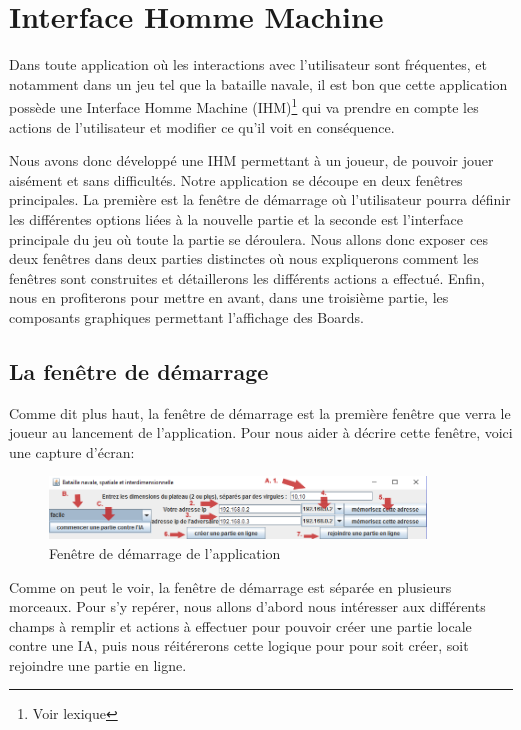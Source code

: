 \section{Interface Homme Machine}
	Dans toute application où les interactions avec l'utilisateur sont fréquentes, et notamment dans un jeu tel que la bataille navale, il est bon que cette application possède une Interface Homme Machine (IHM)\footnote{Voir lexique} qui va prendre en compte les actions de l'utilisateur et modifier ce qu'il voit en conséquence. \newline
	
	Nous avons donc développé une IHM permettant à un joueur, de pouvoir jouer aisément et sans difficultés. Notre application se découpe en deux fenêtres principales. La première est la fenêtre de démarrage où l'utilisateur pourra définir les différentes options liées à la nouvelle partie et la seconde est l'interface principale du jeu où toute la partie se déroulera. Nous allons donc exposer ces deux fenêtres dans deux parties distinctes où nous expliquerons comment les fenêtres sont construites et détaillerons les différents actions a effectué. Enfin, nous en profiterons pour mettre en avant, dans une troisième partie, les composants graphiques permettant l'affichage des Boards. 
	
\subsection{La fenêtre de démarrage}
	Comme dit plus haut, la fenêtre de démarrage est la première fenêtre que verra le joueur au lancement de l'application. Pour nous aider à décrire cette fenêtre, voici une capture d'écran:
	
	\begin{figure}[!h]
		\centering
		\includegraphics [width=10cm]{images/start_window.png}
		\caption{Fenêtre de démarrage de l'application}
		\label {startwindow}
	\end{figure}
	
	Comme on peut le voir, la fenêtre de démarrage est séparée en plusieurs morceaux. Pour s'y repérer, nous allons d'abord nous intéresser aux différents champs à remplir et actions à effectuer pour pouvoir créer une partie locale contre une IA, puis nous réitérerons cette logique pour pour soit créer, soit rejoindre une partie en ligne.
	
